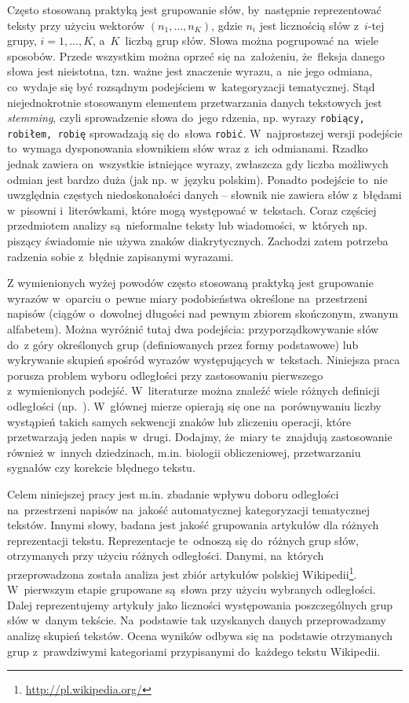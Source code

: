 \documentclass{praca1}
\begin{document}
Często stosowaną praktyką jest grupowanie słów, by~następnie reprezentować teksty przy użyciu wektorów $(n_1,\ldots, n_K)$, gdzie $n_i$ jest licznością słów z~$i$-tej grupy, $i = 1,\ldots,K$, a~$K$~liczbą grup słów. Słowa można pogrupować na~wiele sposobów. Przede wszystkim można oprzeć się na~założeniu, że~fleksja danego słowa jest nieistotna, tzn. ważne jest znaczenie wyrazu, a~nie jego odmiana, co~wydaje się być rozsądnym podejściem w~kategoryzacji tematycznej. Stąd niejednokrotnie stosowanym elementem przetwarzania danych tekstowych jest \emph{stemming}, czyli sprowadzenie słowa do~jego rdzenia, np. wyrazy \verb|robiący, robiłem, robię| sprowadzają się do~słowa \verb|robić|. W~najprostszej wersji podejście to~wymaga dysponowania słownikiem słów wraz z~ich odmianami. Rzadko jednak zawiera on~wszystkie istniejące wyrazy, zwłaszcza gdy liczba możliwych odmian jest bardzo duża (jak np. w~języku polskim). Ponadto podejście to~nie uwzględnia częstych niedoskonałości danych -- słownik nie zawiera słów z~błędami w~pisowni i~literówkami, które mogą występować w~tekstach. Coraz częściej przedmiotem analizy są~nieformalne teksty lub wiadomości, w~których np. piszący świadomie nie używa znaków diakrytycznych. Zachodzi zatem potrzeba radzenia sobie z~błędnie zapisanymi wyrazami. 

Z wymienionych wyżej powodów często stosowaną praktyką jest grupowanie wyrazów w~oparciu o~pewne miary podobieństwa określone na~przestrzeni napisów (ciągów o~dowolnej długości nad pewnym zbiorem skończonym, zwanym alfabetem). Można wyróżnić tutaj dwa podejścia: przyporządkowywanie słów do~z góry określonych grup (definiowanych przez formy podstawowe) lub wykrywanie skupień spośród wyrazów występujących w~tekstach. Niniejsza praca porusza problem wyboru odległości przy zastosowaniu pierwszego z~wymienionych podejść. W~literaturze można znaleźć wiele różnych definicji odległości (np.~\cite{Levenshtein1965:binarycodes, Boytsov2011:indexingmethods, Navarro2001:guidedtour}). W~głównej mierze opierają się one na~porównywaniu liczby wystąpień takich samych sekwencji znaków lub zliczeniu operacji, które przetwarzają jeden napis w~drugi. Dodajmy, że~miary te~znajdują zastosowanie również w~innych dziedzinach, m.in. biologii obliczeniowej, przetwarzaniu sygnałów czy korekcie błędnego tekstu.


Celem niniejszej pracy jest m.in. zbadanie wpływu doboru odległości na~przestrzeni napisów na~jakość automatycznej kategoryzacji tematycznej tekstów. Innymi słowy, badana jest jakość grupowania artykułów dla różnych reprezentacji tekstu. Reprezentacje te~odnoszą się do~różnych grup słów, otrzymanych przy użyciu różnych odległości. Danymi, na~których przeprowadzona została analiza jest zbiór artykułów polskiej Wikipedii\footnote{\url{http://pl.wikipedia.org/}}. W~pierwszym etapie grupowane są~słowa przy użyciu wybranych odległości. Dalej reprezentujemy artykuły jako liczności występowania poszczególnych grup słów w~danym tekście. Na~podstawie tak uzyskanych danych przeprowadzamy analizę skupień tekstów. Ocena wyników odbywa się na~podstawie otrzymanych grup z~prawdziwymi kategoriami przypisanymi do~każdego tekstu Wikipedii.
\end{document}
